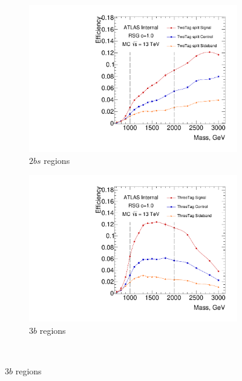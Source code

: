 \begin{figure}[htbp!]
  \centering
  \captionsetup{justification=centering}
    \begin{subfigure}[b]{0.4\textwidth}
        \includegraphics[width=\textwidth,angle=-90]{figures/boosted/SigEff/region_2b_lst_Moriond_Efficiency_PreSel.pdf}
        \caption{$2bs$ regions}
        \label{fig:2bs-selection-region-efficiency}
    \end{subfigure}
    \quad \quad 
    \begin{subfigure}[b]{0.4\textwidth}
        \includegraphics[width=\textwidth,angle=-90]{figures/boosted/SigEff/region_3b_lst_Moriond_Efficiency_PreSel.pdf}
        \caption{$3b$ regions}
        \label{fig:3b-selection-region-efficiency}
    \end{subfigure} \\ 

\end{figure}
